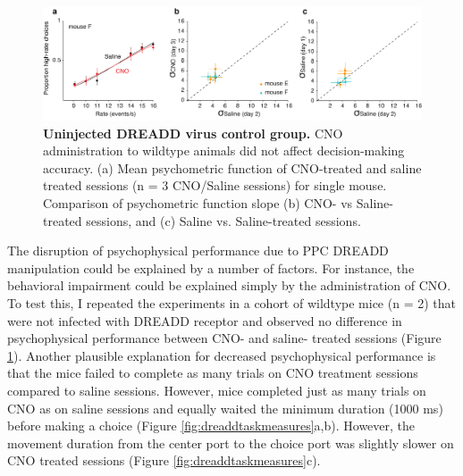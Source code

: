 \begin{figure}
  \centering
  	\includegraphics[width=\textwidth]{Figures/chapter3/dreadd_uninjected_control_mice.png}
  \caption[Uninjected DREADD virus control group]{\textbf{Uninjected DREADD virus control group.} CNO administration to wildtype animals did not affect decision-making accuracy. (a) Mean psychometric function of CNO-treated and saline treated sessions (n = 3 CNO/Saline sessions) for single mouse. Comparison of psychometric function slope (b) CNO- vs Saline-treated sessions, and (c) Saline vs. Saline-treated sessions.}
   \label{fig:dreaddcontrol}
\end{figure}
The disruption of psychophysical performance due to PPC DREADD manipulation could be explained by a number of factors. For instance, the behavioral impairment could be explained simply by the administration of CNO. To test this, I repeated the experiments in a cohort of wildtype mice (n = 2) that were not infected with DREADD receptor and observed no difference in psychophysical performance between CNO- and saline- treated sessions (Figure \ref{fig:dreaddcontrol}). Another plausible explanation for decreased psychophysical performance is that the mice failed to complete as many trials on CNO treatment sessions compared to saline sessions. However, mice completed just as many trials on CNO as on saline sessions and equally waited the minimum duration (1000 ms) before making a choice (Figure \ref{fig:dreaddtaskmeasures}a,b). However, the movement duration from the center port to the choice port was slightly slower on CNO treated sessions (Figure \ref{fig:dreaddtaskmeasures}c).\par 

